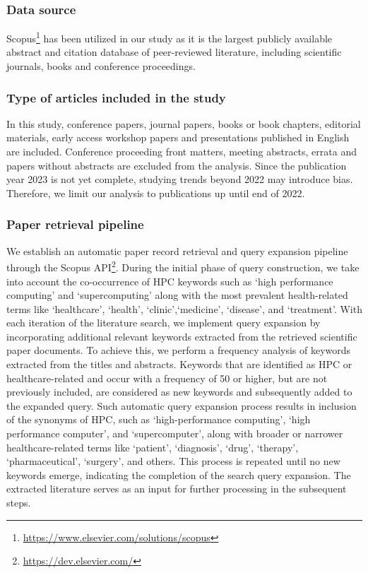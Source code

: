 \subsubsection{Data source}\label{subsubse:2-2.1.1}

Scopus\footnote{\url{https://www.elsevier.com/solutions/scopus}}  has been utilized in our study as it is the largest publicly available abstract and citation database of peer-reviewed literature, including scientific journals, books and conference proceedings.

\subsubsection{Type of articles included in the study}\label{subsubse:2-2.1.2}

In this study, conference papers, journal papers, books or book chapters, editorial materials, early access workshop papers and presentations published in English are included. Conference proceeding front matters, meeting abstracts, errata and papers without abstracts are excluded from the analysis. Since the publication year 2023 is not yet complete, studying trends beyond 2022 may introduce bias. Therefore, we limit our analysis to publications up until end of 2022.



\subsubsection{Paper retrieval pipeline}\label{subsubse:2-2.1.3}

We establish an automatic paper record retrieval and query expansion pipeline through the Scopus API\footnote{\url{https://dev.elsevier.com/}}. During the initial phase of query construction, we take into account the co-occurrence of HPC keywords such as `high performance computing' and `supercomputing' along with the most prevalent health-related terms like `healthcare', `health', `clinic',`medicine', `disease', and `treatment'. With each iteration of the literature search, we implement query expansion by incorporating additional relevant keywords extracted from the retrieved scientific paper documents. To achieve this, we perform a frequency analysis of keywords extracted from the titles and abstracts. Keywords that are identified as HPC or healthcare-related and occur with a frequency of 50 or higher, but are not previously included, are considered as new keywords and subsequently added to the expanded query. Such automatic query expansion process results in inclusion of the synonyms of HPC, such as `high-performance computing', `high performance computer', and `supercomputer', along with broader or narrower healthcare-related terms like `patient', `diagnosis', `drug', `therapy', `pharmaceutical', `surgery', and others. This process is repeated until no new keywords emerge, indicating the completion of the search query expansion. The extracted literature serves as an input for further processing in the subsequent steps.


